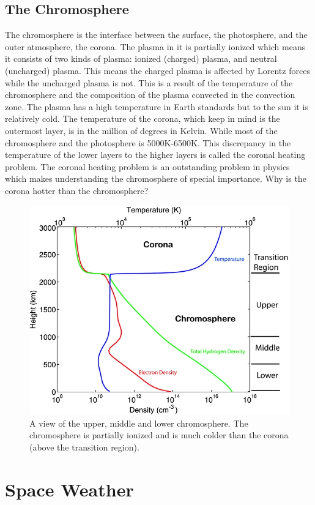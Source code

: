 \documentclass[12pt,upcase]{umlthesis}
\begin{document}
\subsection{The Chromosphere}

The chromosphere is the interface between the surface, the photosphere, and the outer atmosphere, the corona. The plasma in it is partially ionized which means it consists of two kinds of plasma: ionized (charged) plasma, and neutral (uncharged) plasma. This means the charged plasma is affected by Lorentz forces while the uncharged plasma is not. This is a result of the temperature of the chromosphere and the composition of the plasma convected in the convection zone. The plasma has a high temperature in Earth standards but to the sun it is relatively cold. The temperature of the corona, which keep in mind is the outermost layer, is in the million of degrees in Kelvin. While most of the chromosphere and the photosphere is 5000K-6500K. This discrepancy in the temperature of the lower layers to the higher layers is called the coronal heating problem. The coronal heating problem is an outstanding problem in physics which makes understanding the chromosphere of special importance. Why is the corona hotter than the chromosphere?

\begin{figure}[ht!]\label{fig:chromoprofile}
	\centering
	\includegraphics[width=0.75\linewidth]{images/chromoprofile.jpg}
	\caption{A view of the upper, middle and lower chromosphere. The chromosphere is partially ionized and is much colder than the corona (above the transition region).~\citep{Song2014,Avrett2008}}
\end{figure}


\section{Space Weather}
\end{document}
